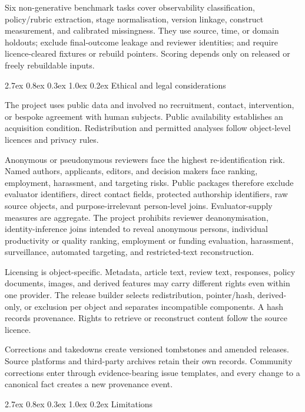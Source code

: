 \documentclass[
  10pt,
]{article}
\makeatletter
\renewcommand\section{\@startsection{section}{1}{\z@}%
  {2.7ex \@plus 0.8ex \@minus 0.3ex}%
  {1.0ex \@plus 0.2ex}%
  {\normalfont\Large\sffamily\bfseries\color{OSGInk}}}
\makeatother
\begin{document}
Six non-generative benchmark tasks cover observability classification,
policy/rubric extraction, stage normalisation, version linkage,
construct measurement, and calibrated missingness.
They use source, time, or domain holdouts; exclude final-outcome leakage
and reviewer identities; and require licence-cleared fixtures or rebuild
pointers. Scoring depends only on released or freely rebuildable inputs.

\section{Ethical and legal
considerations}\label{9-ethical-and-legal-considerations}

The project uses public data and involved no recruitment, contact,
intervention, or bespoke agreement with human subjects. Public
availability establishes an acquisition condition. Redistribution and
permitted analyses follow object-level licences and privacy rules.

Anonymous or pseudonymous reviewers face the highest re-identification
risk. Named authors, applicants, editors, and decision makers face
ranking, employment, harassment, and targeting risks. Public packages
therefore exclude evaluator identifiers, direct contact fields,
protected authorship identifiers, raw source objects, and
purpose-irrelevant person-level joins. Evaluator-supply measures are
aggregate. The project prohibits reviewer deanonymisation,
identity-inference joins intended to reveal anonymous persons,
individual productivity or quality ranking, employment or funding
evaluation, harassment, surveillance, automated targeting, and
restricted-text reconstruction.

Licensing is object-specific. Metadata, article text, review text,
responses, policy documents, images, and derived features may carry
different rights even within one provider. The release builder selects
redistribution, pointer/hash, derived-only, or exclusion per object and
separates incompatible components. A hash records provenance. Rights to
retrieve or reconstruct content follow the source licence.

Corrections and takedowns create versioned tombstones and amended
releases. Source platforms and third-party archives retain their own
records. Community corrections enter through evidence-bearing issue
templates, and every change to a canonical fact creates a new provenance
event.

\section{Limitations}\label{10-limitations}
\end{document}
